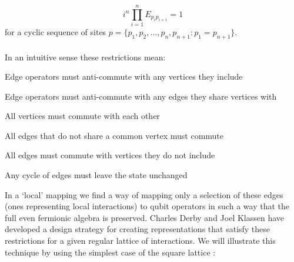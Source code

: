\documentclass[twoside]{article}
\begin{document}
\begin{equation}
        \label{loopcond}
        i^{n} \prod_{i=1}^{n} E_{p_i p_{i+1}} = 1
        \end{equation}
        for a cyclic sequence of sites $p = \{p_1, p_2,\ldots, p_n, p_{n+1}: p_1 = p_{n+1} \}$.\\\\
        In an intuitive sense these restrictions mean:
        \begin{romanlist}
        \item Edge operators must anti-commute with any vertices they include
        \item Edge operators must anti-commute with any edges they share vertices with
        \item All vertices must commute with each other
        \item All edges that do not share a common vertex must commute
        \item All edges must commute with vertices they do not include
        \item Any cycle of edges must leave the state unchanged
        \end{romanlist}
        In a `local' mapping we find a way of mapping only a selection of these edges (ones representing local interactions) to qubit operators in such a way that the full even fermionic algebra is preserved. Charles Derby and Joel Klassen \cite{derbyklassen2} have developed a design strategy for creating representations that satisfy these restrictions for a given regular lattice of interactions. We will illustrate this technique by using the simplest case of the square lattice \cite{derbyklassen}:
\end{document}

